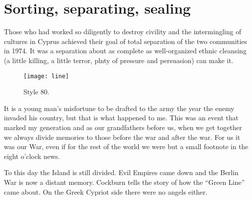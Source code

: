 \makeatletter
\@runinheadtrue
\makeatother
\parskip1pt

\chapter[Template 80]{Sorting, separating, sealing}
\label{ch:style80}

Those who had worked so diligently to destroy civility and the intermingling of cultures in Cyprus achieved their goal of total separation of the two communities in 1974. It was a separation about as complete as well-organized
ethnic cleansing (a little killing, a little terror, plnty of pressure and persuasion) can make it.

\begin{figure}[ht]
\centering
\texttt{[image: line]}
\caption{Style 80.}
\label{fig:style80}
\end{figure} 

It is a young man’s misfortune to be drafted to the army the year the enemy invaded his country, but that is what happened to me. This was an event that marked my generation and as our grandfathers before us, when we get together we always divide memories to those before the war and after the war. For us it was our War, even if for the rest of the world we were but a small footnote in the eight o’clock news. 

To this day the Island is still divided. Evil Empires came down and the Berlin War is now a distant memory. Cockburn tells the story of how the “Green Line” came about. 
On the Greek Cypriot side there were no angels either. 


